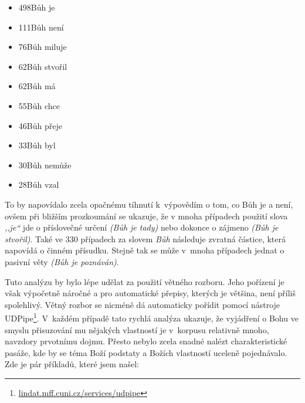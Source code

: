 \begin{itemize}
\item{498\texttimes Bůh je}
\item{111\texttimes Bůh není}
\item{ 76\texttimes Bůh miluje}
\item{ 62\texttimes Bůh stvořil}
\item{ 62\texttimes Bůh má}
\item{ 55\texttimes Bůh chce}
\item{ 46\texttimes Bůh přeje}
\item{ 33\texttimes Bůh byl}
\item{ 30\texttimes Bůh nemůže}
\item{ 28\texttimes Bůh vzal}
\end{itemize}

To by napovídalo zcela opačnému tíhnutí k~výpovědím o tom, co Bůh je a není,
ovšem při bližším prozkoumání se ukazuje, že v mnoha případech použití slova
\textit{,,je``} jde o příslovečné určení \textit{(Bůh je tady)} nebo dokonce o
zájmeno \textit{(Bůh je stvořil)}. Také ve 330 případech za slovem \textit{Bůh}
následuje zvratná částice, která napovídá o činném přísudku. Stejně tak se může
v~mnoha případech jednat o pasivní věty \textit{(Bůh je poznáván)}.

Tuto analýzu by bylo lépe udělat za použití větného rozboru. Jeho pořízení
je však výpočetně náročné a pro automatické přepisy, kterých je většina, není příliš
spolehlivý. Větný rozbor se nicméně dá automaticky pořídit pomocí nástroje UDPipe\cite{udpipe}\footnote{%
\url{lindat.mff.cuni.cz/services/udpipe}}. V~každém případě tato rychlá
analýza ukazuje, že vyjádření o Bohu ve smyslu přisuzování mu nějakých
vlastností je v~korpusu relativně mnoho, navzdory prvotnímu dojmu. Přesto nebylo
zcela snadné nalézt charakteristické pasáže, kde by se téma Boží podstaty a Božích
vlastností uceleně pojednávalo. Zde je pár příkladů, které jsem našel:

